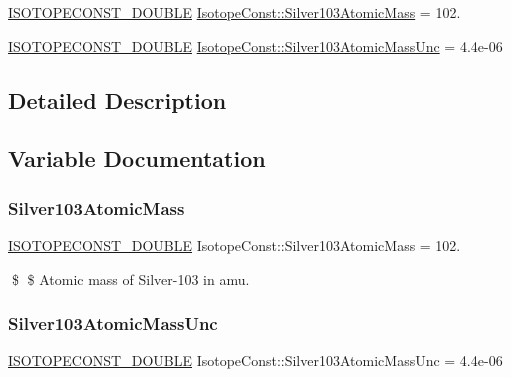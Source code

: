 \begin{DoxyCompactItemize}
\item 
\mbox{\hyperlink{group___isotope_const-_macros_ga8f45a7272ce02c0b4c65c44636ed719a}{I\+S\+O\+T\+O\+P\+E\+C\+O\+N\+S\+T\+\_\+\+D\+O\+U\+B\+LE}} \mbox{\hyperlink{group___isotope_const-_silver-_ag103_ga9c9fce2aba036239b773f6ad58fea05d}{Isotope\+Const\+::\+Silver103\+Atomic\+Mass}} = 102.
\item 
\mbox{\hyperlink{group___isotope_const-_macros_ga8f45a7272ce02c0b4c65c44636ed719a}{I\+S\+O\+T\+O\+P\+E\+C\+O\+N\+S\+T\+\_\+\+D\+O\+U\+B\+LE}} \mbox{\hyperlink{group___isotope_const-_silver-_ag103_ga9db4feaccb3afbda6fff7a375039a8a9}{Isotope\+Const\+::\+Silver103\+Atomic\+Mass\+Unc}} = 4.\+4e-\/06
\end{DoxyCompactItemize}


\subsection{Detailed Description}


\subsection{Variable Documentation}
\mbox{\label{group___isotope_const-_silver-_ag103_ga9c9fce2aba036239b773f6ad58fea05d}} 
\subsubsection{\texorpdfstring{Silver103\+Atomic\+Mass}{Silver103AtomicMass}}
{\footnotesize\ttfamily \mbox{\hyperlink{group___isotope_const-_macros_ga8f45a7272ce02c0b4c65c44636ed719a}{I\+S\+O\+T\+O\+P\+E\+C\+O\+N\+S\+T\+\_\+\+D\+O\+U\+B\+LE}} Isotope\+Const\+::\+Silver103\+Atomic\+Mass = 102.}

\$ \$ Atomic mass of Silver-\/103 in amu. \mbox{\label{group___isotope_const-_silver-_ag103_ga9db4feaccb3afbda6fff7a375039a8a9}} 
\subsubsection{\texorpdfstring{Silver103\+Atomic\+Mass\+Unc}{Silver103AtomicMassUnc}}
{\footnotesize\ttfamily \mbox{\hyperlink{group___isotope_const-_macros_ga8f45a7272ce02c0b4c65c44636ed719a}{I\+S\+O\+T\+O\+P\+E\+C\+O\+N\+S\+T\+\_\+\+D\+O\+U\+B\+LE}} Isotope\+Const\+::\+Silver103\+Atomic\+Mass\+Unc = 4.\+4e-\/06}

